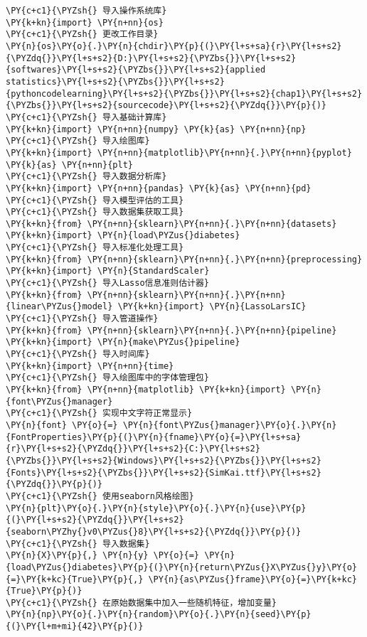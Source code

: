 \begin{Verbatim}[commandchars=\\\{\}]
\PY{c+c1}{\PYZsh{} 导入操作系统库}
\PY{k+kn}{import} \PY{n+nn}{os}
\PY{c+c1}{\PYZsh{} 更改工作目录}
\PY{n}{os}\PY{o}{.}\PY{n}{chdir}\PY{p}{(}\PY{l+s+sa}{r}\PY{l+s+s2}{\PYZdq{}}\PY{l+s+s2}{D:}\PY{l+s+s2}{\PYZbs{}}\PY{l+s+s2}{softwares}\PY{l+s+s2}{\PYZbs{}}\PY{l+s+s2}{applied statistics}\PY{l+s+s2}{\PYZbs{}}\PY{l+s+s2}{pythoncodelearning}\PY{l+s+s2}{\PYZbs{}}\PY{l+s+s2}{chap1}\PY{l+s+s2}{\PYZbs{}}\PY{l+s+s2}{sourcecode}\PY{l+s+s2}{\PYZdq{}}\PY{p}{)}
\PY{c+c1}{\PYZsh{} 导入基础计算库}
\PY{k+kn}{import} \PY{n+nn}{numpy} \PY{k}{as} \PY{n+nn}{np}
\PY{c+c1}{\PYZsh{} 导入绘图库}
\PY{k+kn}{import} \PY{n+nn}{matplotlib}\PY{n+nn}{.}\PY{n+nn}{pyplot} \PY{k}{as} \PY{n+nn}{plt}
\PY{c+c1}{\PYZsh{} 导入数据分析库}
\PY{k+kn}{import} \PY{n+nn}{pandas} \PY{k}{as} \PY{n+nn}{pd}
\PY{c+c1}{\PYZsh{} 导入模型评估的工具}
\PY{c+c1}{\PYZsh{} 导入数据集获取工具}
\PY{k+kn}{from} \PY{n+nn}{sklearn}\PY{n+nn}{.}\PY{n+nn}{datasets} \PY{k+kn}{import} \PY{n}{load\PYZus{}diabetes}
\PY{c+c1}{\PYZsh{} 导入标准化处理工具}
\PY{k+kn}{from} \PY{n+nn}{sklearn}\PY{n+nn}{.}\PY{n+nn}{preprocessing} \PY{k+kn}{import} \PY{n}{StandardScaler}
\PY{c+c1}{\PYZsh{} 导入Lasso信息准则估计器}
\PY{k+kn}{from} \PY{n+nn}{sklearn}\PY{n+nn}{.}\PY{n+nn}{linear\PYZus{}model} \PY{k+kn}{import} \PY{n}{LassoLarsIC}
\PY{c+c1}{\PYZsh{} 导入管道操作}
\PY{k+kn}{from} \PY{n+nn}{sklearn}\PY{n+nn}{.}\PY{n+nn}{pipeline} \PY{k+kn}{import} \PY{n}{make\PYZus{}pipeline}
\PY{c+c1}{\PYZsh{} 导入时间库}
\PY{k+kn}{import} \PY{n+nn}{time}
\PY{c+c1}{\PYZsh{} 导入绘图库中的字体管理包}
\PY{k+kn}{from} \PY{n+nn}{matplotlib} \PY{k+kn}{import} \PY{n}{font\PYZus{}manager}
\PY{c+c1}{\PYZsh{} 实现中文字符正常显示}
\PY{n}{font} \PY{o}{=} \PY{n}{font\PYZus{}manager}\PY{o}{.}\PY{n}{FontProperties}\PY{p}{(}\PY{n}{fname}\PY{o}{=}\PY{l+s+sa}{r}\PY{l+s+s2}{\PYZdq{}}\PY{l+s+s2}{C:}\PY{l+s+s2}{\PYZbs{}}\PY{l+s+s2}{Windows}\PY{l+s+s2}{\PYZbs{}}\PY{l+s+s2}{Fonts}\PY{l+s+s2}{\PYZbs{}}\PY{l+s+s2}{SimKai.ttf}\PY{l+s+s2}{\PYZdq{}}\PY{p}{)}
\PY{c+c1}{\PYZsh{} 使用seaborn风格绘图}
\PY{n}{plt}\PY{o}{.}\PY{n}{style}\PY{o}{.}\PY{n}{use}\PY{p}{(}\PY{l+s+s2}{\PYZdq{}}\PY{l+s+s2}{seaborn\PYZhy{}v0\PYZus{}8}\PY{l+s+s2}{\PYZdq{}}\PY{p}{)}
\PY{c+c1}{\PYZsh{} 导入数据集}
\PY{n}{X}\PY{p}{,} \PY{n}{y} \PY{o}{=} \PY{n}{load\PYZus{}diabetes}\PY{p}{(}\PY{n}{return\PYZus{}X\PYZus{}y}\PY{o}{=}\PY{k+kc}{True}\PY{p}{,} \PY{n}{as\PYZus{}frame}\PY{o}{=}\PY{k+kc}{True}\PY{p}{)}
\PY{c+c1}{\PYZsh{} 在原始数据集中加入一些随机特征，增加变量}
\PY{n}{np}\PY{o}{.}\PY{n}{random}\PY{o}{.}\PY{n}{seed}\PY{p}{(}\PY{l+m+mi}{42}\PY{p}{)}

\end{Verbatim}
